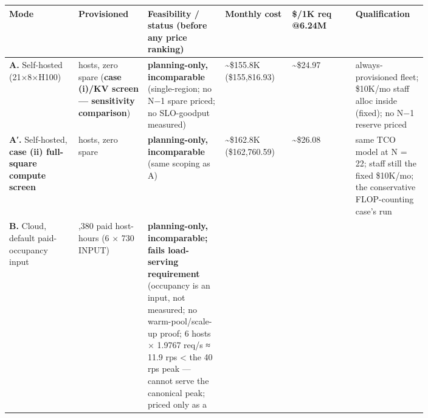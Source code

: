 \nopagebreak[4]
\begin{longtable}[]{@{}
  >{\raggedright\arraybackslash}p{0.1327\linewidth}
  >{\raggedright\arraybackslash}p{0.1327\linewidth}
  >{\raggedright\arraybackslash}p{0.1327\linewidth}
  >{\raggedright\arraybackslash}p{0.1327\linewidth}
  >{\raggedright\arraybackslash}p{0.1327\linewidth}
  >{\raggedright\arraybackslash}p{0.1327\linewidth}@{}}
\toprule\noalign{}
\begin{minipage}[b]{\linewidth}\raggedright
Mode
\end{minipage} & \begin{minipage}[b]{\linewidth}\raggedright
Provisioned
\end{minipage} & \begin{minipage}[b]{\linewidth}\raggedright
Feasibility / status (before any price ranking)
\end{minipage} & \begin{minipage}[b]{\linewidth}\raggedright
Monthly cost
\end{minipage} & \begin{minipage}[b]{\linewidth}\raggedright
\$/1K req @6.24M
\end{minipage} & \begin{minipage}[b]{\linewidth}\raggedright
Qualification
\end{minipage} \\
\midrule\noalign{}
\endhead
\bottomrule\noalign{}
\endlastfoot
\textbf{A.} Self-hosted (21×8×H100) & 21 hosts, zero spare (\textbf{case
(i)/KV screen --- sensitivity comparison}) & \textbf{planning-only,
incomparable} (single-region; no N−1 spare priced; no SLO-goodput
measured) & \textasciitilde\$155.8K (\$155,816.93) &
\textasciitilde\$24.97 & always-provisioned fleet; \$10K/mo staff alloc
inside (fixed); no N−1 reserve priced \\
\noalign{\label{tab:16.1}}
\textbf{A′.} Self-hosted, \textbf{case (ii) full-square compute screen}
& 22 hosts, zero spare & \textbf{planning-only, incomparable} (same
scoping as A) & \textasciitilde\$162.8K (\$162,760.59) &
\textasciitilde\$26.08 & same TCO model at N = 22; staff still the fixed
\$10K/mo; the conservative FLOP-counting case's run \\
\textbf{B.} Cloud, default paid-occupancy input & 4,380 paid host-hours
(6 × 730 INPUT) & \textbf{planning-only, incomparable; fails
load-serving requirement} (occupancy is an input, not measured; no
warm-pool/scale-up proof; 6 hosts × 1.9767 req/s ≈ 11.9 rps \textless{}
the 40 rps peak --- cannot serve the canonical peak; priced only as a

\end{longtable}
